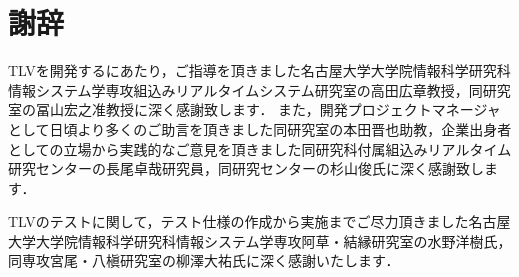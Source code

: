 \chapter*{謝辞}

TLVを開発するにあたり，ご指導を頂きました名古屋大学大学院情報科学研究科情報システム学専攻組込みリアルタイムシステム研究室の高田広章教授，同研究室の冨山宏之准教授に深く感謝致します．
また，開発プロジェクトマネージャとして日頃より多くのご助言を頂きました同研究室の本田晋也助教，企業出身者としての立場から実践的なご意見を頂きました同研究科付属組込みリアルタイム研究センターの長尾卓哉研究員，同研究センターの杉山俊氏に深く感謝致します．

TLVのテストに関して，テスト仕様の作成から実施までご尽力頂きました名古屋大学大学院情報科学研究科情報システム学専攻阿草・結縁研究室の水野洋樹氏，同専攻宮尾・八槇研究室の柳澤大祐氏に深く感謝いたします．
